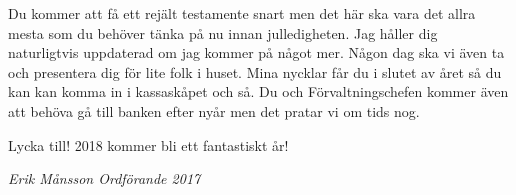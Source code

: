 \documentclass[10pt]{article}
\begin{document}
Du kommer att få ett rejält testamente snart men det här ska vara det allra mesta som du behöver tänka på nu innan julledigheten. Jag håller dig naturligtvis uppdaterad om jag kommer på något mer. Någon dag ska vi även ta och presentera dig för lite folk i huset. Mina nycklar får du i slutet av året så du kan kan komma in i kassaskåpet och så. Du och Förvaltningschefen kommer även att behöva gå till banken efter nyår men det pratar vi om tids nog.

Lycka till! 2018 kommer bli ett fantastiskt år!

\emph{Erik Månsson \newline Ordförande 2017}
\end{document}
